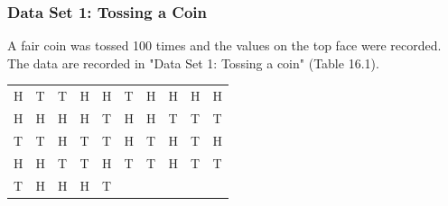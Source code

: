 \begin{description}[noitemsep]
\begin{description}[noitemsep]
            \subsubsection{ Data Set 1: Tossing a Coin}
            \nopagebreak
        \label{m39403*id200822}A fair coin was tossed 100 times and the values on the top face were recorded. The data are recorded in "Data Set 1: Tossing a coin" (Table 16.1).\par 
          \begin{table}
        \begin{center}
      \label{m39403*uid25}
    \noindent
      \tablelasttail{}
      \begin{xtabular}[t]{|l|l|l|l|l|l|l|l|l|l|}\hline
        H &
        T &
        T &
        H &
        H &
        T &
        H &
        H &
        H &
        H%
     \tabularnewline{}
        H &
        H &
        H &
        H &
        T &
        H &
        H &
        T &
        T &
        T%
     \tabularnewline{}
        T &
        T &
        H &
        T &
        T &
        H &
        T &
        H &
        T &
        H%
     \tabularnewline{}
        H &
        H &
        T &
        T &
        H &
        T &
        T &
        H &
        T &
        T%
     \tabularnewline{}
        T &
        H &
        H &
        H &
        T &

\end{xtabular}
\end{center}
\end{table}
\end{description}
\end{description}
